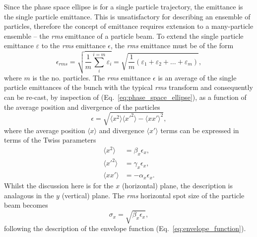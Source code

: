 \documentclass[../main.tex]{subfiles}
\begin{document}
Since the phase space ellipse is for a single particle trajectory, the emittance is the single particle emittance. This is unsatisfactory for describing an ensemble of particles, therefore the concept of emittance requires extension to a many-particle ensemble -- the \textit{rms} emittance of a particle beam. To extend the single particle emittance $\varepsilon$ to the \textit{rms} emittance $\epsilon$, the \textit{rms} emittance must be of the form
\begin{equation}
\epsilon_{rms} = \sqrt{\frac{1}{m}\sum_{i}^{i=m}\varepsilon_{i}} = \sqrt{\frac{1}{m}\left(\varepsilon_{1}+\varepsilon_{2}+\ldots+\varepsilon_{m}\right)},
\label{eq:rms_emittance_transform}    
\end{equation}
where $m$ is the no. particles. The \textit{rms} emittance $\epsilon$ is an average of the single particle emittances of the bunch with the typical \textit{rms} transform and consequently can be re-cast, by inspection of (Eq.~\ref{eq:phase_space_ellipse}), as a function of the average position and divergence of the particles
\begin{equation}
\epsilon = \sqrt{\langle x^{2}\rangle\langle x'^{2}\rangle-\langle xx'\rangle^{2}},
\label{eq:rms_emittance}    
\end{equation}
where the average position $\langle x\rangle$ and divergence $\langle x'\rangle$ terms can be expressed in terms of the Twiss parameters
\begin{align}
\langle x^{2}\rangle &= \beta_{x}\epsilon_{x}, \nonumber\\
\langle x'^{2}\rangle &= \gamma_{x}\epsilon_{x}, \nonumber\\
\langle xx'\rangle &= -\alpha_{x}\epsilon_{x}.
\label{eq:rms_emittance_twiss}    
\end{align}
Whilst the discussion here is for the $x$ (horizontal) plane, the description is analagous in the $y$ (vertical) plane. The \textit{rms} horizontal spot size of the particle beam becomes
\begin{equation}
\sigma_{x} = \sqrt{\beta_{x}\epsilon_{x}},
\label{eq:spot_size_particle}    
\end{equation}
following the description of the envelope function (Eq.~\ref{eq:envelope_function}).
\end{document}

